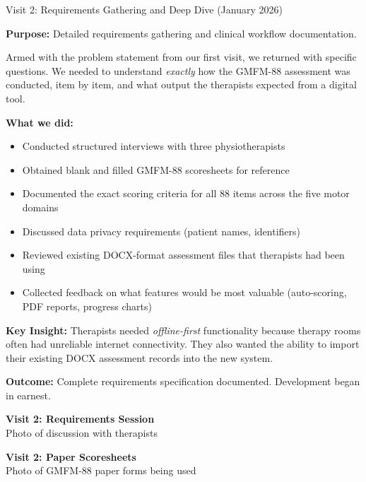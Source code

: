 \documentclass[11pt,a4paper]{article}
\begin{document}
\begin{visitbox}[visitgreen]{Visit 2: Requirements Gathering and Deep Dive (January 2026)}

\textbf{Purpose:} Detailed requirements gathering and clinical workflow documentation.

Armed with the problem statement from our first visit, we returned with specific questions. We needed to understand \textit{exactly} how the GMFM-88 assessment was conducted, item by item, and what output the therapists expected from a digital tool.

\textbf{What we did:}
\begin{itemize}[leftmargin=1.5em, itemsep=2pt]
    \item Conducted structured interviews with three physiotherapists
    \item Obtained blank and filled GMFM-88 scoresheets for reference
    \item Documented the exact scoring criteria for all 88 items across the five motor domains
    \item Discussed data privacy requirements (patient names, identifiers)
    \item Reviewed existing DOCX-format assessment files that therapists had been using
    \item Collected feedback on what features would be most valuable (auto-scoring, PDF reports, progress charts)
\end{itemize}

\textbf{Key Insight:} Therapists needed \textit{offline-first} functionality because therapy rooms often had unreliable internet connectivity. They also wanted the ability to import their existing DOCX assessment records into the new system.

\textbf{Outcome:} Complete requirements specification documented. Development began in earnest.

\vspace{0.3cm}
\begin{minipage}{0.48\textwidth}
    \begin{photoplaceholder}[height=4.5cm]
        \vspace{1.2cm}
        {\small\bfseries Visit 2: Requirements Session}\\[0.2cm]
        {\footnotesize Photo of discussion with therapists}
    \end{photoplaceholder}
\end{minipage}
\hfill
\begin{minipage}{0.48\textwidth}
    \begin{photoplaceholder}[height=4.5cm]
        \vspace{1.2cm}
        {\small\bfseries Visit 2: Paper Scoresheets}\\[0.2cm]
        {\footnotesize Photo of GMFM-88 paper forms being used}
    \end{photoplaceholder}
\end{minipage}

\end{visitbox}
\end{document}
